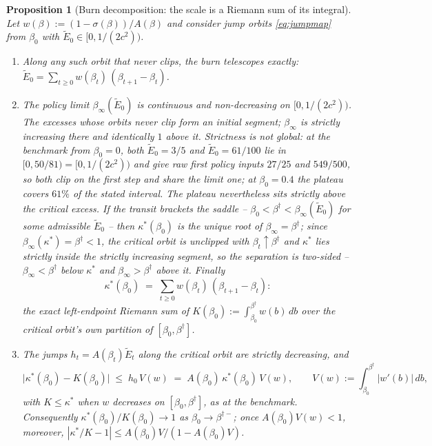\documentclass[11pt]{article}
\newtheorem{proposition}[theorem]{Proposition}
\theoremstyle{definition}
\theoremstyle{remark}
\numberwithin{equation}{section}
\begin{document}
\begin{proposition}[Burn decomposition: the scale is a Riemann sum of its integral]\label{prop:burn}
Let $w(\beta) := (1-\sigma(\beta))/A(\beta)$ and consider jump orbits \eqref{eq:jumpmap} from $\beta_0$ with $\tilde E_0 \in [0, 1/(2c^2))$.
\begin{enumerate}
\item[(i)] Along any such orbit that never clips, the burn telescopes exactly:
$\tilde E_0 = \sum_{t\ge0} w(\beta_t)\,(\beta_{t+1}-\beta_t)$.
\item[(ii)] The policy limit $\beta_\infty(\tilde E_0)$ is continuous and non-decreasing on $[0, 1/(2c^2))$. The excesses whose orbits never clip form an initial segment; $\beta_\infty$ is strictly increasing there and identically $1$ above it. Strictness is not global: at the benchmark from $\beta_0 = 0$, both $\tilde E_0 = 3/5$ and $\tilde E_0 = 61/100$ lie in $[0, 50/81) = [0, 1/(2c^2))$ and give raw first policy inputs $27/25$ and $549/500$, so both clip on the first step and share the limit one; at $\beta_0 = 0.4$ the plateau covers $61\%$ of the stated interval. The plateau nevertheless sits strictly above the critical excess. If the transit brackets the saddle -- $\beta_0 < \beta^\dagger < \beta_\infty(\tilde E_0)$ for some admissible $\tilde E_0$ -- then $\kappa^\ast(\beta_0)$ is the unique root of $\beta_\infty = \beta^\dagger$; since $\beta_\infty(\kappa^\ast) = \beta^\dagger < 1$, the critical orbit is unclipped with $\beta_t \uparrow \beta^\dagger$ and $\kappa^\ast$ lies strictly inside the strictly increasing segment, so the separation is two-sided -- $\beta_\infty < \beta^\dagger$ below $\kappa^\ast$ and $\beta_\infty > \beta^\dagger$ above it. Finally
\[
\kappa^\ast(\beta_0) \;=\; \sum_{t\ge0} w(\beta_t)\,(\beta_{t+1}-\beta_t):
\]
the exact left-endpoint Riemann sum of $K(\beta_0) := \int_{\beta_0}^{\beta^\dagger} w(b)\,db$ over the critical orbit's own partition of $[\beta_0, \beta^\dagger]$.
\item[(iii)] The jumps $h_t = A(\beta_t)\tilde E_t$ along the critical orbit are strictly decreasing, and
\[
\bigl|\kappa^\ast(\beta_0) - K(\beta_0)\bigr| \;\le\; h_0\, V(w)
\;=\; A(\beta_0)\,\kappa^\ast(\beta_0)\, V(w),
\qquad V(w) := \int_{\beta_0}^{\beta^\dagger} |w'(b)|\,db,
\]
with $K \le \kappa^\ast$ when $w$ decreases on $[\beta_0,\beta^\dagger]$, as at the benchmark. Consequently $\kappa^\ast(\beta_0)/K(\beta_0) \to 1$ as $\beta_0 \to \beta^{\dagger-}$; once $A(\beta_0)V(w) < 1$, moreover, $|\kappa^\ast/K - 1| \le A(\beta_0)V/(1-A(\beta_0)V)$.
\end{enumerate}
\end{proposition}
\end{document}
